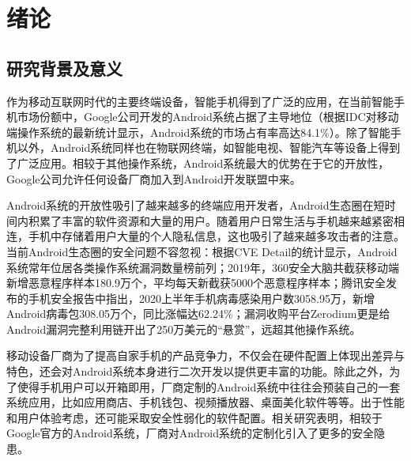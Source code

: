 \documentclass[winfonts,master,twoside]{njuthesis}
\begin{document}
\listoffigures

\listoftables

\mainmatter

\chapter{绪论}\label{chapter_introduction}
\section{研究背景及意义}

作为移动互联网时代的主要终端设备，智能手机得到了广泛的应用，在当前智能手机市场份额中，Google公司开发的Android系统占据了主导地位（根据IDC对移动端操作系统的最新统计\cite{smartphoneos}显示，Android系统的市场占有率高达84.1\%）。除了智能手机以外，Android系统同样也在物联网终端，如智能电视、智能汽车等设备上得到了广泛应用。相较于其他操作系统，Android系统最大的优势在于它的开放性，Google公司允许任何设备厂商加入到Android开发联盟中来。

Android系统的开放性吸引了越来越多的终端应用开发者，Android生态圈在短时间内积累了丰富的软件资源和大量的用户。随着用户日常生活与手机越来越紧密相连，手机中存储着用户大量的个人隐私信息，这也吸引了越来越多攻击者的注意。当前Android生态圈的安全问题不容忽视：根据CVE Detail的统计\cite{CVE}显示，Android系统常年位居各类操作系统漏洞数量榜前列；2019年，360安全大脑共截获移动端新增恶意程序样本180.9万个，平均每天新截获5000个恶意程序样本\cite{360-mobile-security}；腾讯安全发布的手机安全报告\cite{tencent-mobile-security}中指出，2020上半年手机病毒感染用户数3058.95万，新增Android病毒包308.05万个，同比涨幅达62.24\%；漏洞收购平台Zerodium更是给Android漏洞完整利用链开出了250万美元的“悬赏”，远超其他操作系统\cite{zerodium}。

移动设备厂商为了提高自家手机的产品竞争力，不仅会在硬件配置上体现出差异与特色，还会对Android系统本身进行二次开发以提供更丰富的功能。除此之外，为了使得手机用户可以开箱即用，厂商定制的Android系统中往往会预装自己的一套系统应用，比如应用商店、手机钱包、视频播放器、桌面美化软件等等。出于性能和用户体验考虑，还可能采取安全性弱化的软件配置。相关研究表明，相较于Google官方的Android系统，厂商对Android系统的定制化引入了更多的安全隐患\cite{gallo2015security}\cite{aafer2016harvesting}\cite{farhang2020empirical}。
\end{document}
